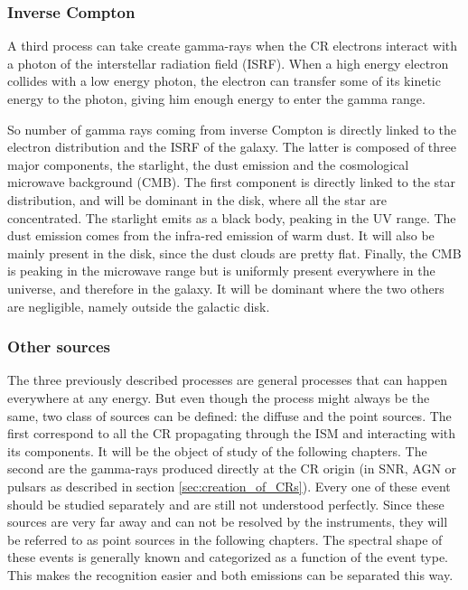 

\subsubsection{Inverse Compton}


A third process can take create gamma-rays when the CR electrons interact with a photon of the interstellar radiation field (ISRF). When a high energy electron collides with a low energy photon, the electron can transfer some of its kinetic energy to the photon, giving him enough energy to enter the gamma range.

So number of gamma rays coming from inverse Compton is directly linked to the electron distribution and the ISRF of the galaxy. The latter is composed of three major components, the starlight, the dust emission and the cosmological microwave background (CMB). The first component is directly linked to the star distribution, and will be dominant in the disk, where all the star are concentrated. The starlight emits as a black body, peaking in the UV range. The dust emission comes from the infra-red emission of warm dust. It will also be mainly present in the disk, since the dust clouds are pretty flat. Finally, the CMB is peaking in the microwave range but is uniformly present everywhere in the universe, and therefore in the galaxy. It will be dominant where the two others are negligible, namely outside the galactic disk.



\subsubsection{Other sources}

The three previously described processes are general processes that can happen everywhere at any energy. But even though the process might always be the same, two class of sources can be defined: the diffuse and the point sources. 
The first correspond to all the CR propagating through the ISM and interacting with its components. It will be the object of study of the following chapters. 
The second are the gamma-rays produced directly at the CR origin (in SNR, AGN or pulsars as described in section \ref{sec:creation_of_CRs}). Every one of these event should be studied separately and are still not understood perfectly. Since these sources are very far away and can not be resolved by the instruments, they will be referred to as point sources in the following chapters. The spectral shape of these events is generally known and categorized as a function of the event type. This makes the recognition easier and both emissions can be separated 
this way.


